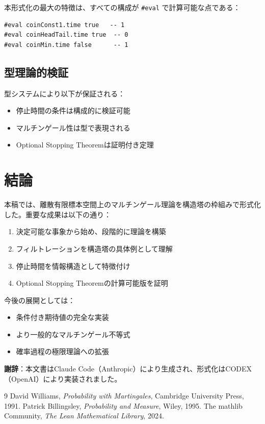 \documentclass[a4paper,12pt]{ltjsarticle}
\theoremstyle{definition}
\begin{document}
本形式化の最大の特徴は、すべての構成が \texttt{\#eval} で計算可能な点である：

\begin{lstlisting}[language=Lean]
#eval coinConst1.time true   -- 1
#eval coinHeadTail.time true  -- 0
#eval coinMin.time false      -- 1
\end{lstlisting}

\subsection{型理論的検証}

型システムにより以下が保証される：
\begin{itemize}
\item 停止時間の条件は構成的に検証可能
\item マルチンゲール性は型で表現される
\item Optional Stopping Theoremは証明付き定理
\end{itemize}

\section{結論}

本稿では、離散有限標本空間上のマルチンゲール理論を構造塔の枠組みで形式化した。重要な成果は以下の通り：

\begin{enumerate}
\item 決定可能な事象から始め、段階的に理論を構築
\item フィルトレーションを構造塔の具体例として理解
\item 停止時間を情報構造として特徴付け
\item Optional Stopping Theoremの計算可能版を証明
\end{enumerate}

今後の展開としては：
\begin{itemize}
\item 条件付き期待値の完全な実装
\item より一般的なマルチンゲール不等式
\item 確率過程の極限理論への拡張
\end{itemize}

\vspace{1cm}

\noindent \textbf{謝辞}：本文書はClaude Code（Anthropic）により生成され、形式化はCODEX（OpenAI）により実装されました。

\begin{thebibliography}{9}
 David Williams, \textit{Probability with Martingales}, Cambridge University Press, 1991.
 Patrick Billingsley, \textit{Probability and Measure}, Wiley, 1995.
 The mathlib Community, \textit{The Lean Mathematical Library}, 2024.
\end{thebibliography}
\end{document}
